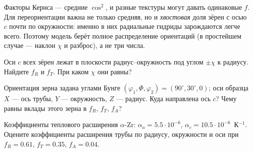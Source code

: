 \begin{warnbox}
Факторы Кернса --- средние $\cos^2$, и разные текстуры могут давать одинаковые $f$. Для переориентации важна не только
средняя, но и \emph{хвостовая} доля зёрен с осью $c$ почти по окружности: именно в них радиальные гидриды
зарождаются легче всего. Поэтому модель берёт полное распределение ориентаций (в простейшем случае --- наклон $\chi$
и разброс), а не три числа.
\end{warnbox}

\begin{exercise}
Оси $c$ всех зёрен лежат в плоскости радиус--окружность под углом $\pm\chi$ к радиусу. Найдите $f_R$ и $f_T$.
При каком $\chi$ они равны?
\end{exercise}

\begin{exercise}
Ориентация зерна задана углами Бунге $(\varphi_1, \Phi, \varphi_2) = (90^\circ, 30^\circ, 0)$; оси образца $X$ --- ось
трубы, $Y$ --- окружность, $Z$ --- радиус. Куда направлена ось $c$? Чему равны вклады этого зерна в $f_R$, $f_T$, $f_A$?
\end{exercise}

\begin{exercise}
Коэффициенты теплового расширения $\alpha$-Zr: $\alpha_a = 5.5\cdot10^{-6}$, $\alpha_c = 10.5\cdot10^{-6}$~К$^{-1}$. Оцените
коэффициенты расширения трубы по радиусу, окружности и оси при $f_R = 0.61$, $f_T = 0.35$, $f_A = 0.04$.
\end{exercise}
